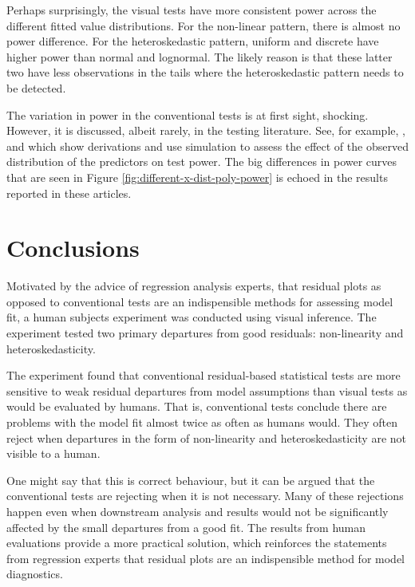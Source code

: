 \documentclass[]{interact}
\theoremstyle{plain}%
\theoremstyle{definition}
\theoremstyle{remark}
\begin{document}
Perhaps surprisingly, the visual tests have more consistent power across
the different fitted value distributions. For the non-linear pattern,
there is almost no power difference. For the heteroskedastic pattern,
uniform and discrete have higher power than normal and lognormal. The
likely reason is that these latter two have less observations in the
tails where the heteroskedastic pattern needs to be detected.

The variation in power in the conventional tests is at first sight,
shocking. However, it is discussed, albeit rarely, in the testing
literature. See, for example, \citet{jamshidian2007study},
\citet{olvera2019relationship} and \citet{zhang2018practical} which show
derivations and use simulation to assess the effect of the observed
distribution of the predictors on test power. The big differences in
power curves that are seen in Figure
\ref{fig:different-x-dist-poly-power} is echoed in the results reported
in these articles.

\hypertarget{conclusions}{%
\section{Conclusions}\label{conclusions}}

Motivated by the advice of regression analysis experts, that residual
plots as opposed to conventional tests are an indispensible methods for
assessing model fit, a human subjects experiment was conducted using
visual inference. The experiment tested two primary departures from good
residuals: non-linearity and heteroskedasticity.

The experiment found that conventional residual-based statistical tests
are more sensitive to weak residual departures from model assumptions
than visual tests as would be evaluated by humans. That is, conventional
tests conclude there are problems with the model fit almost twice as
often as humans would. They often reject when departures in the form of
non-linearity and heteroskedasticity are not visible to a human.

One might say that this is correct behaviour, but it can be argued that
the conventional tests are rejecting when it is not necessary. Many of
these rejections happen even when downstream analysis and results would
not be significantly affected by the small departures from a good fit.
The results from human evaluations provide a more practical solution,
which reinforces the statements from regression experts that residual
plots are an indispensible method for model diagnostics.
\end{document}
